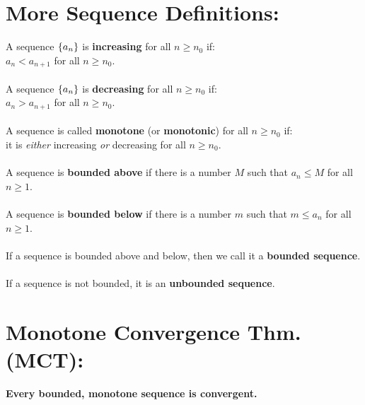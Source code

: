 \section*{More Sequence Definitions: }
A sequence \(\lbrace a_n \rbrace\) is \textbf{increasing} for all \(n\geq n_0\) if:\\
 \(a_n < a_{n+1}\) for all \(n\geq n_0\).\\~\\
A sequence \(\lbrace a_n \rbrace\) is \textbf{decreasing} for all \(n\geq n_0\) if:\\
 \(a_n > a_{n+1}\) for all \(n\geq n_0\).\\~\\
A sequence is called \textbf{monotone} (or \textbf{monotonic}) for all \(n\geq n_0\) if:\\
 it is \textit{either} increasing \textit{or} decreasing for all \(n\geq n_0\).\\

~\\

A sequence is \textbf{bounded above} if there is a number \(M\) such that \(a_n\leq M\) for all \(n\geq 1\).\\~\\
A sequence is \textbf{bounded below} if there is a number \(m\) such that \(m\leq a_n\) for all \(n\geq 1\).\\~\\
If a sequence is bounded above and below, then we call it a \textbf{bounded sequence}.\\~\\
If a sequence is not bounded, it is an \textbf{unbounded sequence}.\\




\section*{Monotone Convergence Thm. (MCT):}


\textbf{Every bounded, monotone sequence is convergent.}

